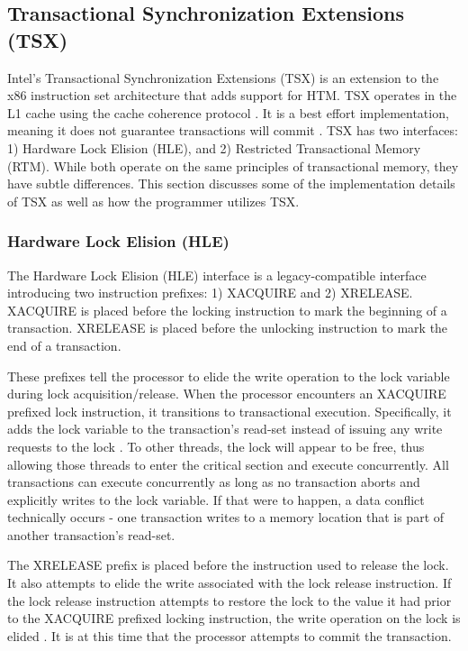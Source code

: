 \documentclass[a4paper]{article}
\begin{document}
\subsection{\textbf{Transactional Synchronization Extensions (TSX)}}

\indent
Intel's Transactional Synchronization Extensions (TSX) is an extension
to the x86 instruction set architecture that adds support for HTM.  TSX operates
in the L1 cache using the cache coherence protocol \cite{intel_opt_man}.  It is
a best effort implementation, meaning it does not guarantee transactions will
commit \cite{intel_prog_ref}.  TSX has two interfaces: 1) Hardware Lock Elision
(HLE), and 2) Restricted Transactional Memory (RTM).  While both operate on the
same principles of transactional memory, they have subtle differences.  This
section discusses some of the implementation details of TSX as well as how the
programmer utilizes TSX.
\par

\subsubsection{\textbf{Hardware Lock Elision (HLE)}}

\indent 
The Hardware Lock Elision (HLE) interface is a legacy-compatible
interface introducing two instruction prefixes: 1) XACQUIRE and 2) XRELEASE.
XACQUIRE is placed before the locking instruction to mark the beginning of a
transaction.  XRELEASE is placed before the unlocking instruction to mark the
end of a transaction.
\par

\indent 
These prefixes tell the processor to elide the write operation to the lock
variable during lock acquisition/release.  When the processor encounters an
XACQUIRE prefixed lock instruction, it transitions to transactional execution.
Specifically, it adds the lock variable to the transaction's read-set instead of
issuing any write requests to the lock \cite{intel_prog_ref}.  To other threads,
the lock will appear to be free, thus allowing those threads to enter the
critical section and execute concurrently.  All transactions can execute
concurrently as long as no transaction aborts and explicitly writes to the lock
variable.  If that were to happen, a data conflict technically occurs - one
transaction writes to a memory location that is part of another transaction's
read-set.
\par

\indent 
The XRELEASE prefix is placed before the instruction used to release the
lock.  It also attempts to elide the write associated with the lock release
instruction.  If the lock release instruction attempts to restore the lock to the
value it had prior to the XACQUIRE prefixed locking instruction, the write
operation on the lock is elided \cite{intel_prog_ref}.  It is at this time that
the processor attempts to commit the transaction.
\par
\end{document}
